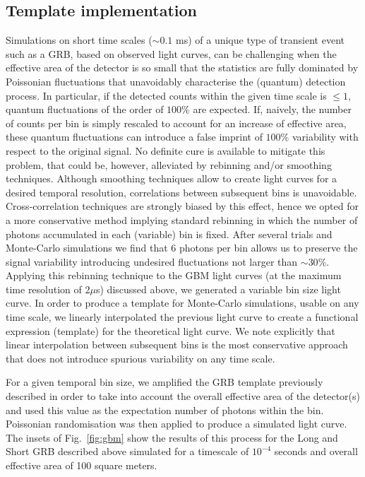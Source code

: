 \documentclass[]{spie}  %
\begin{document}

\subsection{Template implementation}

Simulations on short time scales ($\sim0.1$ ms) of a unique type of transient 
event such as a GRB, based on observed light curves, can be challenging when the 
effective area of the detector is so small that the statistics are fully dominated 
by Poissonian fluctuations that unavoidably characterise the (quantum) detection 
process. 
In particular, if the detected counts within the given time scale is $\le 1$, 
quantum fluctuations of the order of $100\%$ are expected. If, naively, the 
number of counts per bin is simply rescaled to account for an increase of 
effective area, these quantum fluctuations can introduce a false imprint of 
$100\%$ variability with respect to the original signal. No definite cure is 
available to mitigate this problem, that could be, however, alleviated by 
rebinning and/or smoothing techniques. Although smoothing techniques allow to 
create light curves for a desired temporal resolution, correlations between 
subsequent bins is unavoidable. Cross-correlation techniques are strongly 
biased by this effect, hence we opted for a more conservative method implying 
standard rebinning in which the number of photons accumulated in each (variable) 
bin is fixed. After several trials and Monte-Carlo simulations we find that 
6 photons per bin allows us to preserve the signal variability introducing undesired 
fluctuations not larger than $\sim 30\%$. 
Applying this rebinning technique to the GBM light curves (at the maximum time 
resolution of $2\mu$s) discussed above, we generated a variable bin size light 
curve. In order to produce a template for Monte-Carlo simulations, usable on any 
time scale, we linearly interpolated the previous light curve to create a 
functional expression (template) for the theoretical light curve. We note explicitly 
that linear interpolation between subsequent bins is the most conservative approach 
that does not introduce spurious variability on any time scale.
 
For a given temporal bin size, we amplified the GRB template previously described 
in order to take into account the overall effective area of the detector(s) and 
used this value as the expectation number of photons within the bin. 
Poissonian randomisation was then applied to produce a simulated light curve. 
The insets of Fig.~\ref{fig:gbm} show the results of this process for the Long and 
Short GRB described above simulated for a timescale of $10^{-4}$ seconds and overall 
effective area of 100 square meters. 
\end{document}
